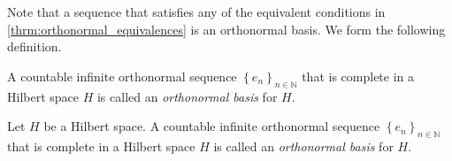 Note that a sequence that satisfies any of the equivalent conditions in \cref{thrm:orthonormal_equivalences} is an orthonormal basis. We form the following definition.




\begin{definition}\label{def:ONB}
    A countable infinite orthonormal sequence $\left\{ e_{n} \right\}_{n\in \mathbb{N}}$ that is complete in a Hilbert space $H$ is called an \emph{orthonormal basis} for $H$.
\end{definition}

\begin{definition}\label{def:ONB}
    Let $H$ be a Hilbert space. A countable infinite orthonormal sequence $\left\{ e_{n} \right\}_{n\in \mathbb{N}}$ that is complete in a Hilbert space $H$ is called an \emph{orthonormal basis} for $H$.
\end{definition}




